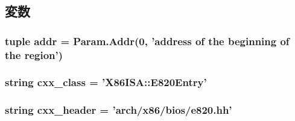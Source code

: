 \subsection{変数}
\hypertarget{classE820_1_1X86E820Entry_a2173c231c978de69ce30d0430739f1a1}{
\subsubsection[{addr}]{\setlength{\rightskip}{0pt plus 5cm}tuple {\bf addr} = {\bf Param.Addr}(0, 'address of the beginning of the region')}}
\label{classE820_1_1X86E820Entry_a2173c231c978de69ce30d0430739f1a1}
\hypertarget{classE820_1_1X86E820Entry_a58cd55cd4023648e138237cfc0822ae3}{
\subsubsection[{cxx\_\-class}]{\setlength{\rightskip}{0pt plus 5cm}string {\bf cxx\_\-class} = '{\bf X86ISA::E820Entry}'}}
\label{classE820_1_1X86E820Entry_a58cd55cd4023648e138237cfc0822ae3}
\hypertarget{classE820_1_1X86E820Entry_a17da7064bc5c518791f0c891eff05fda}{
\subsubsection[{cxx\_\-header}]{\setlength{\rightskip}{0pt plus 5cm}string {\bf cxx\_\-header} = 'arch/x86/bios/e820.hh'}}
\label{classE820_1_1X86E820Entry_a17da7064bc5c518791f0c891eff05fda}


